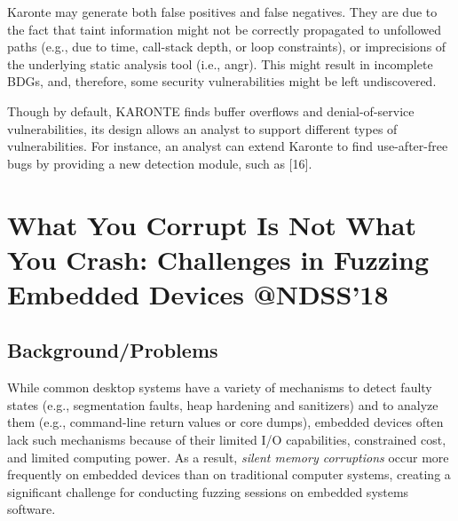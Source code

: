 Karonte may generate both false positives and false negatives. They are due to the fact that taint information might not be correctly propagated to unfollowed paths (e.g., due to time, call-stack depth, or loop constraints), or imprecisions of the underlying static analysis tool (i.e., angr). This might result in incomplete BDGs, and, therefore, some security vulnerabilities might be left undiscovered. 

Though by default, KARONTE finds buffer overflows and denial-of-service vulnerabilities, its design allows an analyst to support different types of vulnerabilities. For instance, an analyst can extend Karonte to find use-after-free bugs by providing a new detection module, such as [16].
\newpage
\section{What You Corrupt Is Not What You Crash: Challenges in Fuzzing Embedded Devices @NDSS'18}
\subsection{Background/Problems}
While common desktop systems have a variety of mechanisms to detect faulty states (e.g., segmentation faults, heap hardening and sanitizers) and to analyze them (e.g., command-line return values or core dumps), embedded devices often lack such mechanisms because of their limited I/O capabilities, constrained cost, and limited computing power.  As a result, \emph{silent memory corruptions} occur more frequently on embedded devices than on traditional computer systems, creating a significant challenge for conducting fuzzing sessions on embedded systems software.
